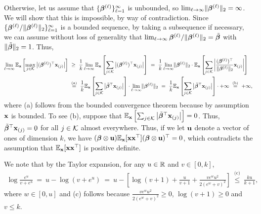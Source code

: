 Otherwise, let us assume that $\{\bm{\beta}^{(\ell)}\}_{\ell=1}^{\infty}$ is unbounded, so $\lim_{\ell \rightarrow\infty}\lVert \bm{\beta}^{(\ell)}\rVert_2 = \infty$. 
We will show that this is impossible, by way of contradiction. 
Since $\{\bm{\beta}^{(\ell)}/\lVert \bm{\beta}^{(\ell)} \rVert_2\}_{\ell=1}^{\infty}$ is a bounded sequence, by taking a subsequence if necessary, we can assume without loss of generality that $\lim_{\ell \rightarrow\infty}\bm{\beta}^{(\ell)}/\lVert \bm{\beta}^{(\ell)}\rVert_2 = \tilde{\bm{\beta}}$ with $\lVert \tilde{\bm{\beta}}\rVert_2 = 1$.
Thus, 
\begin{align}
\label{eqn:bound-infty}
\lim_{\ell \rightarrow\infty}\mathbb{E}_{\mathbf{x}}\left[\max_{j \in \mathcal{K}}\big|(\bm{\beta}^{(\ell)})^{\top}\mathbf{x}_{(j)}\big|\right] &~\geq~ \frac{1}{k}\lim_{\ell \rightarrow\infty}\mathbb{E}_{\mathbf{x}}\left[\sum_{j\in \mathcal{K}}\big|(\bm{\beta}^{(\ell)})^{\top}\mathbf{x}_{(j)}\big|\right]~=~ \frac{1}{k}\lim_{\ell \rightarrow\infty}\lVert \bm{\beta}^{(\ell)} \rVert_2\cdot\mathbb{E}_{\mathbf{x}}\left[\sum_{j\in \mathcal{K}}\left|\frac{(\bm{\beta}^{(\ell)})^{\top}}{\lVert \bm{\beta}^{(\ell)} \rVert_2}\mathbf{x}_{(j)}\right|\right]
    \nonumber\\&~\stackrel{\text{(a)}}{=}~\frac{1}{k}\mathbb{E}_{\mathbf{x}}\left[\sum_{j\in \mathcal{K}}\left|\tilde{\bm{\beta}}^{\top}\mathbf{x}_{(j)}\right|\right] \cdot\lim_{\ell \rightarrow\infty}\lVert \bm{\beta}^{(\ell)} \rVert_2~=~\frac{1}{k}\mathbb{E}_{\mathbf{x}}\left[\sum_{j\in \mathcal{K}}\left|\tilde{\bm{\beta}}^{\top}\mathbf{x}_{(j)}\right|\right] \cdot+\infty~\stackrel{\text{(b)}}{=}~+\infty,
\end{align}
where (a) follows from the bounded convergence theorem because by assumption $\mathbf{x}$ is bounded. 
To see (b), suppose that $\mathbb{E}_{\mathbf{x}}\left[\sum_{j\in \mathcal{K}}\left|\tilde{\bm{\beta}}^{\top}\mathbf{x}_{(j)}\right|\right] = 0$. Thus, $\tilde{\bm{\beta}}^{\top}\mathbf{x}_{(j)} = 0$ for all $j \in \mathcal{K}$ almost everywhere. 
Thus, if we let $\mathbf{u}$ denote a vector of ones of dimension $k$, 
we have $(\bm{\beta}\otimes\mathbf{u})\mathbb{E}_{\mathbf{x}}[\mathbf{x}\mathbf{x}^{\top}](\bm{\beta}\otimes\mathbf{u})^{\top} = 0$, which contradicts the assumption that $\mathbb{E}_{\mathbf{x}}[\mathbf{x}\mathbf{x}^{\top}]$ is positive definite. 

We note that by the Taylor expansion, for any $u\in \mathbb{R}$ and $v \in [0, k]$, 
\begin{align}
\label{eqn:taylor}
    \log \frac{e^u}{v + e^u} ~=~ u - \log\left(v + e^u\right)~=~ u - 
\left[
\log(v+1) + \frac{u}{v+1} +  \frac{ve^{{w}}u^2}{2(e^w +v
)^2}\right]
~\stackrel{\text{(c)}}{\leq}~ \frac{ku}{k+1},
\end{align}
where $w\in [0, u]$ and (c) follows because $\frac{ve^{{w}}u^2}{2(e^w +v
)^2} \geq 0$, $\log(v+1) \geq 0$ and $v\leq k$.   

